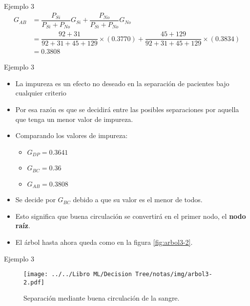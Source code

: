 \documentclass[11pt,aspectratio=169]{beamer}
\begin{document}
\begin{frame}{Ejemplo 3}
	\begin{align*}
		G_{AB} &= \dfrac{P_{Si}}{P_{Si} + P_{No}}G_{Si} + \dfrac{P_{No}}{P_{Si}+P_{No}}G_{No} \\
			&= \dfrac{92+31}{92+31+45+129}\times (0.3770) + \dfrac{45+129}{92+31+45+129}\times (0.3834)\\
			&= 0.3808
	\end{align*}
\end{frame}

\begin{frame}{Ejemplo 3}
	\begin{itemize}
		\item La impureza es un efecto no deseado en la separación de pacientes bajo cualquier criterio\pause
		\item Por esa razón es que se decidirá entre las posibles separaciones por aquella que tenga un 
			menor valor de impureza.\pause
		\item Comparando los valores de impureza:\pause
			\begin{itemize}
				\item $G_{DP} = 0.3641$
				\item $G_{BC} = 0.36$
				\item $G_{AB} = 0.3808$
			\end{itemize}
		\item Se decide por $G_{BC}$ debido a que su valor es el menor de todos.\pause
		\item Esto significa que buena circulación se convertirá en el primer nodo, el \textbf{nodo raíz}.\pause
		\item El árbol hasta ahora queda como en la figura \ref{fig:arbol3-2}.
	\end{itemize}
\end{frame}

\begin{frame}{Ejemplo 3}
	\begin{figure}[H]
		\centering
		\texttt{[image: ../../Libro ML/Decision Tree/notas/img/arbol3-2.pdf]}
		\caption{Separación mediante buena circulación de la sangre.}
	\end{figure}
\end{frame}
\end{document}
